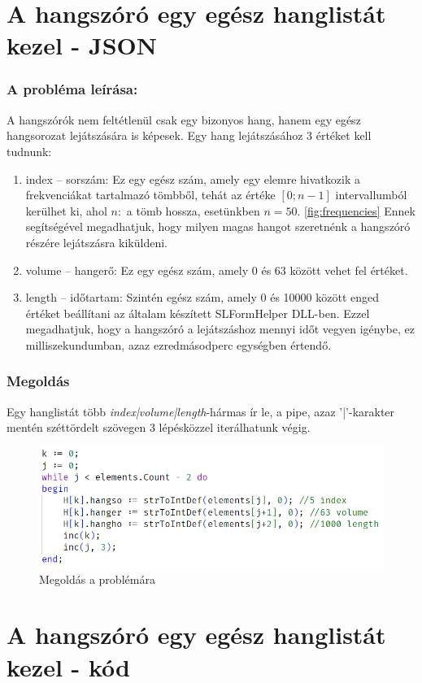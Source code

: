 \documentclass[tocnopagenum]{thesis-ekf}
\theoremstyle{definition}
\theoremstyle{remark}
\begin{document}
	\section{A hangszóró egy egész hanglistát kezel - JSON}
	\subsubsection{A probléma leírása:} A hangszórók nem feltétlenül csak egy bizonyos hang, hanem egy egész hangsorozat lejátszására is képesek. Egy hang lejátszásához 3 értéket kell tudnunk:
	\begin{enumerate}
		\item index -- sorszám: Ez egy egész szám, amely egy elemre hivatkozik a frekvenciákat tartalmazó tömbből, tehát az értéke $[0;n-1]$ intervallumból kerülhet ki, ahol $n: $ a tömb hossza, esetünkben $n=50$. \ref{fig:frequencies} Ennek segítségével megadhatjuk, hogy milyen magas hangot szeretnénk a hangszóró részére lejátszásra kiküldeni.
		\item volume -- hangerő: Ez egy egész szám, amely 0 és 63 között vehet fel értéket.
		\item length -- időtartam: Szintén egész szám, amely 0 és 10000 között enged értéket beállítani az általam készített SLFormHelper DLL-ben. Ezzel megadhatjuk, hogy a hangszóró a lejátszáshoz mennyi időt vegyen igénybe, ez milliszekundumban, azaz ezredmásodperc egységben értendő.
	\end{enumerate}
	\subsubsection{Megoldás}
	Egy hanglistát több \textit{index|volume|length}-hármas ír le, a pipe, azaz '|'-karakter mentén széttördelt szövegen 3 lépésközzel iterálhatunk végig.
	\begin{figure}[h!]
		\centering
		\includegraphics{speaker_solved}
		\caption{Megoldás a problémára}
		\label{speaker_solved}
	\end{figure}
	\section{A hangszóró egy egész hanglistát kezel - kód}
\end{document}
